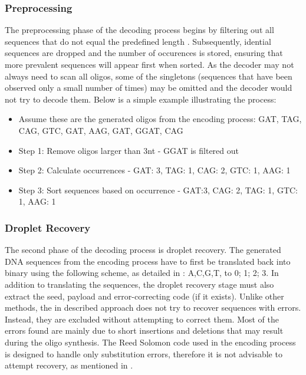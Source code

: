 \documentclass[12pt]%
{article}
\begin{document}
\subsubsection{Preprocessing}

The preprocessing phase of the decoding process begins by filtering out all sequences that do not equal the predefined length \cite{erlich2017dnasupplementary}. Subsequently, idential sequences are dropped and the number of occurences is stored, ensuring that more prevalent sequences will appear first when sorted. As the decoder may not always need to scan all oligos, some of the singletons (sequences that have been observed only a small number of times) may be omitted and the decoder would not try to decode them. Below is a simple example illustrating the process:

\begin{itemize}
\item Assume these are the generated oligos from the encoding process: GAT, TAG, CAG, GTC, GAT, AAG, GAT, GGAT, CAG
\item Step 1: Remove oligos larger than 3nt - GGAT is filtered out
\item Step 2: Calculate occurrences - GAT: 3, TAG: 1, CAG: 2, GTC: 1, AAG: 1
\item Step 3: Sort sequences based on occurrence - GAT:3, CAG: 2, TAG: 1, GTC: 1, AAG: 1
\end{itemize}

\subsubsection{Droplet Recovery}\label{subsec:droplet_recovery}

The second phase of the decoding process is droplet recovery. The generated DNA sequences from the encoding process have to first be translated back into binary using the following scheme, as detailed in  \cite{erlich2017dnasupplementary}: {A,C,G,T}, to {0; 1; 2; 3}. In addition to translating the sequences, the droplet recovery stage must also extract the seed, payload and error-correcting code (if it exists). Unlike other methods, the in \cite{erlich2017dna} described approach does not try to recover sequences with errors. Instead, they are excluded without attempting to correct them. Most of the errors found are mainly due to short insertions and deletions that may result during the oligo synthesis. The Reed Solomon code used in the encoding process is designed to handle only substitution errors, therefore it is not advisable to attempt recovery, as mentioned in \cite{erlich2017dnasupplementary}.
\end{document}
